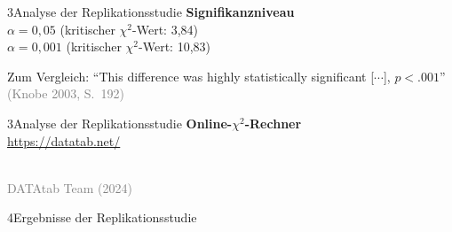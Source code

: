 \documentclass[xcolor=table,9pt,aspectratio=169]{beamer}
\begin{document}
\begin{frame}{\vspace*{10mm}3\hspace*{1em}Analyse der Replikationsstudie}
\textbf{Signifikanzniveau}\\
\smallskip
$\alpha=0,05$ (kritischer $\chi^{2}$-Wert: 3,84)\\
\smallskip
$\alpha=0,001$ (kritischer $\chi^{2}$-Wert: 10,83)

\bigskip
Zum Vergleich: \enquote{This difference was highly statistically significant [$\cdots$], $p<.001$}\\
\textcolor{gray}{(Knobe 2003, S.~192)}

\end{frame}


\begin{frame}{\vspace*{10mm}3\hspace*{1em}Analyse der Replikationsstudie}
\textbf{Online-$\chi^{2}$-Rechner}\\
\smallskip
\url{https://datatab.net/}

\bigskip
\begin{center}
   \\
   \textcolor{gray}{DATAtab Team (2024)}
\end{center}
\end{frame}


\begin{frame}
\begin{overlayarea}{\textwidth}{0.81\paperheight}{
   \vspace*{11mm}
   \textcolor{uolblue}
   {4\hspace*{1em}Ergebnisse der Replikationsstudie}
}
\end{overlayarea}
\end{frame}
\end{document}
